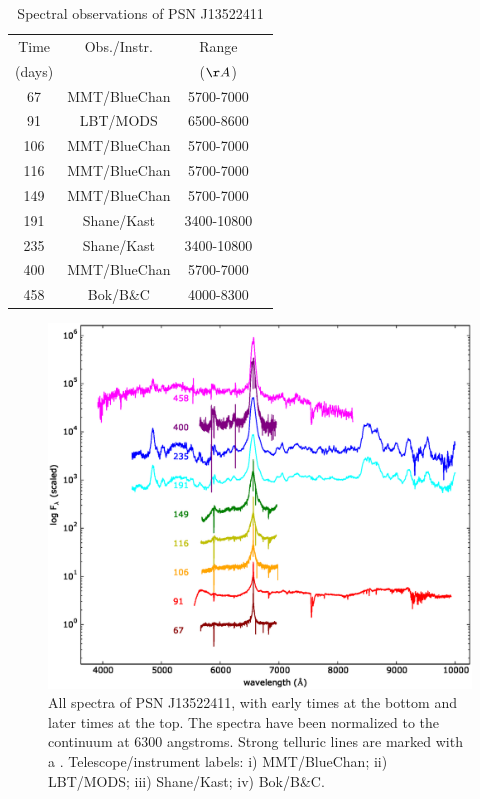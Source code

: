 \documentclass[a4paper,fleqn,usenatbib]{mnras}
\begin{document}
\begin{table}
\caption{Spectral observations of PSN J13522411}
\centering
\label{tab:spectra}
\begin{tabular}{@{}cccc}
\hline
Time &Obs./Instr. &Range \\
(days) & &($\AA$) \\
\hline
67  &MMT/BlueChan &5700-7000 \\
91  &LBT/MODS     &6500-8600 \\
106 &MMT/BlueChan &5700-7000 \\
116 &MMT/BlueChan &5700-7000 \\
149 &MMT/BlueChan &5700-7000 \\
191 &Shane/Kast   &3400-10800 \\
235 &Shane/Kast   &3400-10800 \\
400 &MMT/BlueChan &5700-7000 \\
458 &Bok/B\&C     &4000-8300 \\
\hline
\end{tabular}
\end{table}

\begin{figure}
  \centering
  \includegraphics[width=18cm]{graphics/full.eps}
  \caption{All spectra of PSN J13522411, with early times at the bottom and later times at the top. The spectra have been normalized to the continuum at 6300 angstroms. Strong telluric lines are marked with a \oplus. Telescope/instrument labels: i) MMT/BlueChan; ii) LBT/MODS; iii) Shane/Kast; iv) Bok/B\&C.}
  \label{fig:full}
\end{figure}
\end{document}
